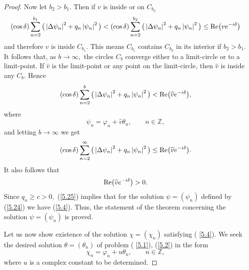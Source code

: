 \documentclass[11pt]{article}
\numberwithin{equation}{section}
\begin{document}
\begin{proof}
Now let $b_{2}>b_{1}.$ Then if $v$ is inside or on $C_{b_{2}}$%
\[
(\cos \delta )\sum_{n=2}^{b_{1}}\big( \left\vert \Delta \psi
_{n}\right\vert ^{2}+q_{n}\left\vert \psi _{n}\right\vert ^{2}\big) <(\cos
\delta )\sum_{n=2}^{b_{2}}\big( \left\vert \Delta \psi _{n}\right\vert
^{2}+q_{n}\left\vert \psi _{n}\right\vert ^{2}\big) \leq {\rm Re}
\big(ve^{-i\delta }\big)
\]%
and therefore $v$ is inside $C_{b_{1}}.$ This means $C_{b_{1}}$ contains $%
C_{b_{2}}$ in its interior if $b_{2}>b_{1}.$ It follows that, as $%
b\rightarrow \infty ,$ the circles $C_{b}$ converge either to a limit-circle
or to a limit-point. If $\widehat{v}$ is the limit-point or any point on the
limit-circle, then $\widehat{v}$ is inside any $C_{b}.$ Hence%
\[
(\cos \delta )\sum_{n=2}^{b}\big( \left\vert \Delta \psi _{n}\right\vert
^{2}+q_{n}\left\vert \psi _{n}\right\vert ^{2}\big) <{\rm Re}\big(\widehat{v}%
e^{-i\delta }\big),
\]%
where%
\begin{equation}
\psi _{n}=\varphi _{n}+\widehat{v}\theta _{n},\qquad n\in
\mathbb{Z}
,  \label{5.24}
\end{equation}%
and letting $b\rightarrow \infty $ we get%
\begin{equation}
(\cos \delta )\sum_{n=2}^{\infty }\big( \left\vert \Delta \psi
_{n}\right\vert ^{2}+q_{n}\left\vert \psi _{n}\right\vert ^{2}\big) \leq
{\rm Re}\big(\widehat{v}e^{-i\delta }\big).  \label{5.25}
\end{equation}%
It also follows that%
\begin{equation}
{\rm Re}\big(\widehat{v}e^{-i\delta }\big)>0.  \label{5.26}
\end{equation}%
Since $q_{n}\geq c>0,$ (\ref{5.25}) implies that for the solution $\psi
=(\psi _{n})$ def\/ined by (\ref{5.24}) we have (\ref{5.4}). Thus, the
statement of the theorem concerning the solution $\psi =(\psi _{n})$ is
proved.

Let us now show existence of the solution $\chi =(\chi _{n})$ satisfying (%
\ref{5.4}). We seek the desired solution $\theta =(\theta _{n})$ of problem (%
\ref{5.1}), (\ref{5.2}) in the form%
\[
\chi _{n}=\varphi _{n}+u\theta _{n},\qquad n\in
\mathbb{Z}
,
\]
where $u$ is a complex constant to be determined.


\end{proof}
\end{document}
